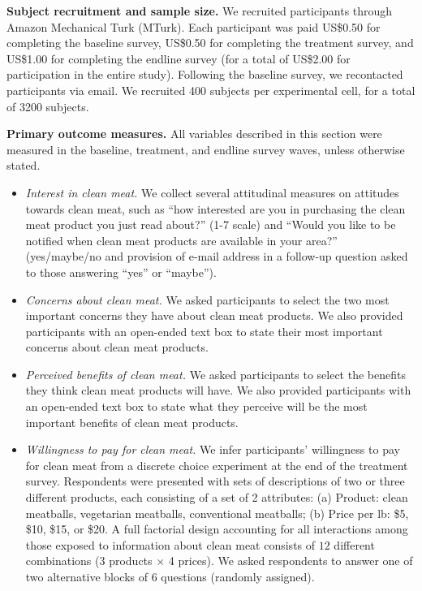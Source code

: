 \documentclass[12pt]{article}
\begin{document}
\textbf{Subject recruitment and sample size.} We recruited participants through Amazon Mechanical Turk (MTurk). Each participant was paid US\$0.50 for completing the baseline survey, US\$0.50 for completing the treatment survey, and US\$1.00 for completing the endline survey (for a total of US\$2.00 for participation in the entire study). Following the baseline survey, we recontacted participants via email. We recruited 400 subjects per experimental cell, for a total of 3200 subjects.



\textbf{Primary outcome measures.} All variables described in this section were measured in the baseline, treatment, and endline survey waves, unless otherwise stated. 


\begin{itemize}
    \item \textit{Interest in clean meat.} We collect several attitudinal measures on attitudes towards clean meat, such as ``how interested are you in purchasing the clean meat product you just read about?'' (1-7 scale) and ``Would you like to be notified when clean meat products are available in your area?'' (yes/maybe/no and provision of e-mail address in a follow-up question asked to those answering ``yes'' or ``maybe'').

    \item \textit{Concerns about clean meat.} We asked participants to select the two most important concerns they have about clean meat products. We also provided participants with an open-ended text box to state their most important concerns about clean meat products.

    \item \textit{Perceived benefits of clean meat.} We asked participants to select the benefits they think clean meat products will have. We also provided participants with an open-ended text box to state what they perceive will be the most important benefits of clean meat products.

    \item \textit{Willingness to pay for clean meat.} We infer participants’ willingness to pay for clean meat from a discrete choice experiment at the end of the treatment survey. Respondents were presented with sets of descriptions of two or three different products, each consisting of a set of 2 attributes: (a) Product: clean meatballs, vegetarian meatballs, conventional meatballs; (b) Price per lb: \$5, \$10, \$15, or \$20. A full factorial design accounting for all interactions among those exposed to information about clean meat consists of $12$ different combinations (3 products $\times$ 4 prices). We asked respondents to answer one of two alternative blocks of 6 questions (randomly assigned).
\end{itemize}
\end{document}
